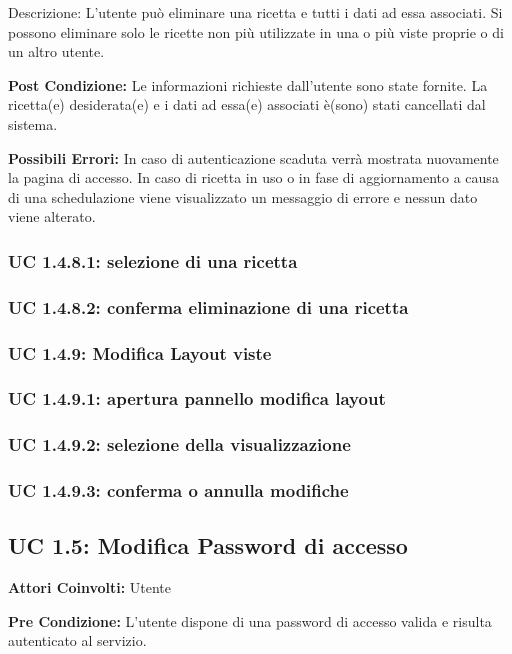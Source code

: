 Descrizione:
L’utente può eliminare una ricetta e tutti i dati ad essa associati.
Si possono eliminare solo le ricette non più utilizzate in una o più viste proprie o di un altro utente.    

\textbf{Post Condizione:}
Le informazioni richieste dall'utente sono state fornite.
La ricetta(e) desiderata(e) e i dati ad essa(e) associati è(sono) stati cancellati dal sistema.

\textbf{Possibili Errori:}
In caso di autenticazione scaduta verrà mostrata nuovamente la pagina di accesso.
In caso di ricetta in uso o in fase di aggiornamento a causa di una schedulazione viene visualizzato un messaggio di errore e nessun dato viene alterato.

\subsubsection{UC 1.4.8.1: selezione di una ricetta}
\subsubsection{UC 1.4.8.2: conferma eliminazione di una ricetta}
\subsubsection{UC 1.4.9: Modifica Layout viste }
\subsubsection{UC 1.4.9.1: apertura pannello modifica layout}
\subsubsection{UC 1.4.9.2: selezione della visualizzazione}
\subsubsection{UC 1.4.9.3: conferma o annulla modifiche}



\subsection{UC 1.5: Modifica Password di accesso}

\textbf{Attori Coinvolti:}
Utente

\textbf{Pre Condizione:}
L'utente dispone di una password di accesso valida e risulta autenticato al servizio.

